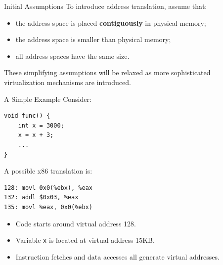 \begin{frame}{Initial Assumptions}
    To introduce address translation, assume that:

    \begin{itemize}
        \item the address space is placed \textbf{contiguously}
              in physical memory;
        \item the address space is smaller than physical memory;
        \item all address spaces have the same size.
    \end{itemize}

    \begin{alertblock}{}
        These simplifying assumptions will be relaxed as more
        sophisticated virtualization mechanisms are introduced.
    \end{alertblock}
\end{frame}


\begin{frame}[fragile]{A Simple Example}
    Consider:

\begin{verbatim}
void func() {
    int x = 3000;
    x = x + 3;
    ...
}
\end{verbatim}

    A possible x86 translation is:

\begin{verbatim}
128: movl 0x0(%ebx), %eax
132: addl $0x03, %eax
135: movl %eax, 0x0(%ebx)
\end{verbatim}

    \begin{itemize}
        \item Code starts around virtual address 128.
        \item Variable \texttt{x} is located at virtual address 15KB.
        \item Instruction fetches and data accesses all generate
              virtual addresses.
    \end{itemize}
\end{frame}


